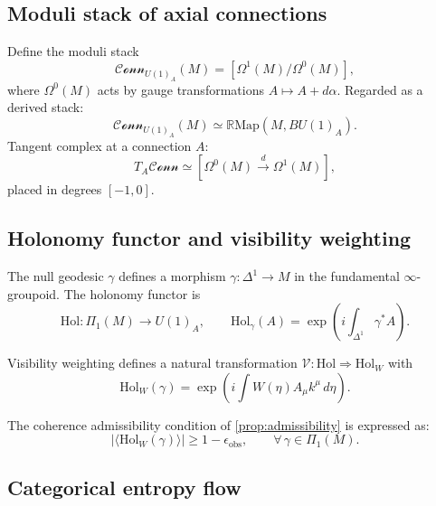 \documentclass[12pt]{article}
\theoremstyle{definition}
\begin{document}
\subsection{Moduli stack of axial connections}

Define the moduli stack
\begin{equation}
  \mathcal{Conn}_{U(1)_A}(M)
  = \left[\Omega^1(M)\Big/\Omega^0(M)\right],
\end{equation}
where $\Omega^0(M)$ acts by gauge transformations $A\mapsto A+d\alpha$.
Regarded as a derived stack:
\begin{equation}
  \mathcal{Conn}_{U(1)_A}(M)
  \simeq\mathbb{R}\mathrm{Map}(M,BU(1)_A).
\end{equation}
Tangent complex at a connection $A$:
\begin{equation}
  T_A\mathcal{Conn}\simeq
  \left[\Omega^0(M)\xrightarrow{d}\Omega^1(M)\right],
\end{equation}
placed in degrees $[-1,0]$.

\subsection{Holonomy functor and visibility weighting}

The null geodesic $\gamma$ defines a morphism
$\gamma:\Delta^1\to M$ in the fundamental $\infty$-groupoid.
The holonomy functor is
\begin{equation}
  \mathrm{Hol}:\Pi_1(M)\to U(1)_A,
  \qquad
  \mathrm{Hol}_\gamma(A)=\exp\!\left(i\int_{\Delta^1}\gamma^\ast A\right).
\end{equation}

Visibility weighting defines a natural transformation
$\mathcal{V}:\mathrm{Hol}\Rightarrow\mathrm{Hol}_W$ with
\begin{equation}
  \mathrm{Hol}_W(\gamma)
  =\exp\!\left(i\int W(\eta)A_\mu k^\mu\,d\eta\right).
\end{equation}

The coherence admissibility condition of \cref{prop:admissibility}
is expressed as:
\begin{equation}
  \left|\langle\mathrm{Hol}_W(\gamma)\rangle\right|
  \geq1-\epsilon_{\mathrm{obs}},
  \qquad
  \forall\,\gamma\in\Pi_1(M).
\end{equation}

\subsection{Categorical entropy flow}
\end{document}
